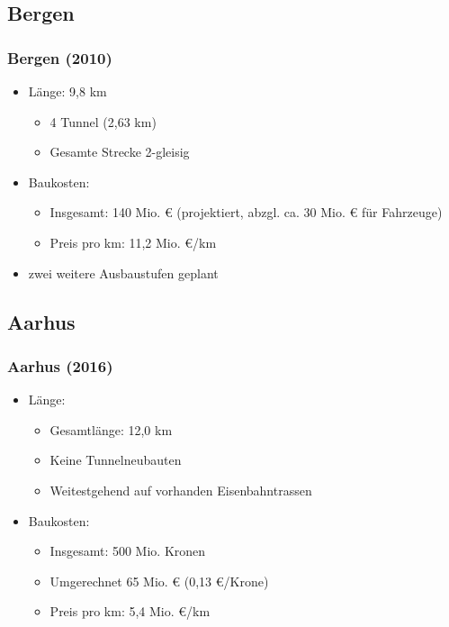 \documentclass[xcolor=dvipsnames]{beamer}
\begin{document}

\subsection{Bergen}
\begin{frame}
  \frametitle{Bergen (2010)}

  \begin{itemize}
  \item Länge: 9,8 km
    \begin{itemize}
    \item 4 Tunnel (2,63 km)
    \item Gesamte Strecke 2-gleisig
    \end{itemize}
  \item Baukosten:
    \begin{itemize}
    \item Insgesamt: 140 Mio. € (projektiert, abzgl. ca. 30
      Mio. € für Fahrzeuge)
    \item Preis pro km: 11,2 Mio. €/km
    \end{itemize}
  \item zwei weitere Ausbaustufen geplant
  \end{itemize}
\end{frame}


\subsection{Aarhus}
\begin{frame}
  \frametitle{Aarhus (2016)}

  \begin{itemize}
  \item Länge:
    \begin{itemize}
    \item Gesamtlänge: 12,0 km
    \item Keine Tunnelneubauten
    \item Weitestgehend auf vorhanden Eisenbahntrassen
    \end{itemize}
  \item Baukosten:
    \begin{itemize}
    \item Insgesamt: 500 Mio. Kronen
    \item Umgerechnet 65 Mio. € (0,13 €/Krone)
    \item Preis pro km: 5,4 Mio. €/km
    \end{itemize}
  \end{itemize}
\end{frame}
\end{document}
